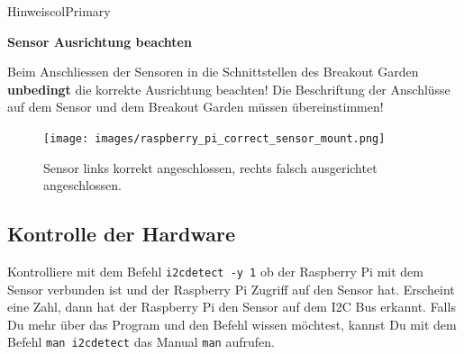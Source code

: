 \documentclass[
  11pt,
  a4paper,
  oneside, openany  ,captions=tableheading
]{scrbook}
\theoremstyle{remark}
\begin{document}
\begin{boxtitle}{Hinweis}{colPrimary}

\textbf{Sensor Ausrichtung beachten}

Beim Anschliessen der Sensoren in die Schnittstellen des Breakout Garden
\textbf{unbedingt} die korrekte Ausrichtung beachten! Die Beschriftung
der Anschlüsse auf dem Sensor und dem Breakout Garden müssen
übereinstimmen!

\begin{figure}[H]

{\centering \texttt{[image: images/raspberry\_pi\_correct\_sensor\_mount.png]}

}

\caption{Sensor links korrekt angeschlossen, rechts falsch ausgerichtet
angeschlossen.}

\end{figure}%

\end{boxtitle}

\subsection*{Kontrolle der Hardware}\label{kontrolle-der-hardware}

Kontrolliere mit dem Befehl \texttt{i2cdetect\ -y\ 1} ob der Raspberry
Pi mit dem Sensor verbunden ist und der Raspberry Pi Zugriff auf den
Sensor hat. Erscheint eine Zahl, dann hat der Raspberry Pi den Sensor
auf dem I2C Bus erkannt. Falls Du mehr über das Program und den Befehl
wissen möchtest, kannst Du mit dem Befehl \texttt{man\ i2cdetect} das
Manual \texttt{man} aufrufen.
\end{document}
